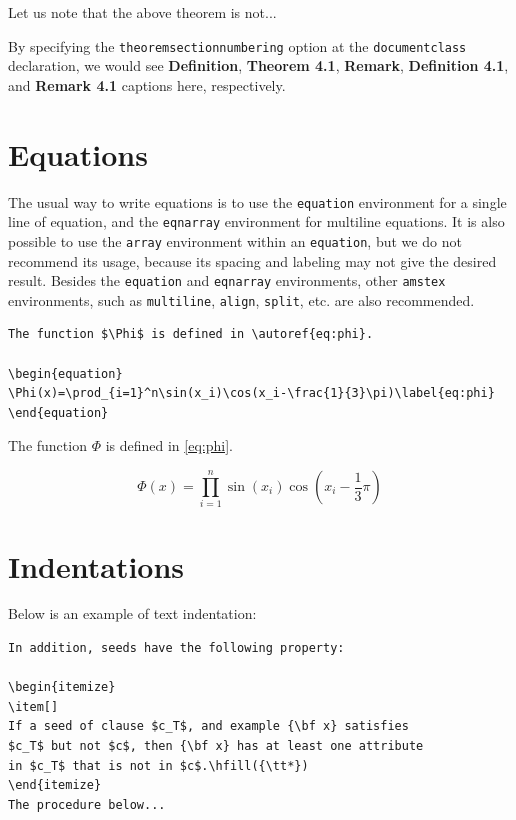 \documentclass[withtitlethanks]{actacyb}
\begin{document}
\begin{remark}
Let us note that the above theorem is not...
\end{remark}

By specifying the {\tt theoremsectionnumbering} option at the \verb|documentclass|
declaration, we would see \textbf{Definition}, \textbf{Theorem 4.1}, \textbf{Remark}, \textbf{Definition 4.1}, and \textbf{Remark 4.1} captions here, respectively.


\section{Equations}

The usual way to write equations is to use the \verb|equation| environment for a single line
of equation, and the \verb|eqnarray| environment for multiline equations.
It is also possible to use the \verb|array| environment within an \verb|equation|,
but we do not recommend its usage, because its spacing and labeling may not give the desired result.
Besides the \verb|equation| and \verb|eqnarray| environments,
other \verb|amstex| environments, such as \verb|multiline|, \verb|align|, \verb|split|, etc. 
are also recommended.

\begin{verbatim}
The function $\Phi$ is defined in \autoref{eq:phi}.

\begin{equation}
\Phi(x)=\prod_{i=1}^n\sin(x_i)\cos(x_i-\frac{1}{3}\pi)\label{eq:phi}
\end{equation}
\end{verbatim}

The function $\Phi$ is defined in \autoref{eq:phi}.

\begin{equation}
\Phi(x)=\prod_{i=1}^n\sin(x_i)\cos(x_i-\frac{1}{3}\pi)\label{eq:phi}
\end{equation}


\section{Indentations}

Below is an example of text indentation:

\begin{verbatim}
In addition, seeds have the following property:

\begin{itemize}
\item[] 
If a seed of clause $c_T$, and example {\bf x} satisfies 
$c_T$ but not $c$, then {\bf x} has at least one attribute 
in $c_T$ that is not in $c$.\hfill({\tt*})
\end{itemize}
The procedure below...
\end{verbatim}
\end{document}
